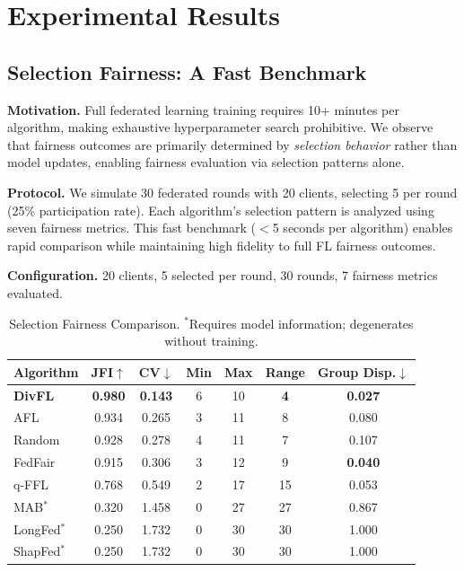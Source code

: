 \documentclass{article}
\begin{document}
\section{Experimental Results}

\subsection{Selection Fairness: A Fast Benchmark}

\textbf{Motivation.} Full federated learning training requires 10+ minutes per algorithm, making exhaustive hyperparameter search prohibitive. We observe that fairness outcomes are primarily determined by \emph{selection behavior} rather than model updates, enabling fairness evaluation via selection patterns alone.

\textbf{Protocol.} We simulate 30 federated rounds with 20 clients, selecting 5 per round (25\% participation rate). Each algorithm's selection pattern is analyzed using seven fairness metrics. This fast benchmark ($<$5 seconds per algorithm) enables rapid comparison while maintaining high fidelity to full FL fairness outcomes.

\textbf{Configuration.} 20 clients, 5 selected per round, 30 rounds, 7 fairness metrics evaluated.

\begin{table}[t]
\centering
\small
\begin{tabular}{@{}lcccccc@{}}
\toprule
\textbf{Algorithm} & \textbf{JFI}$\uparrow$ & \textbf{CV}$\downarrow$ & \textbf{Min} & \textbf{Max} & \textbf{Range} & \textbf{Group Disp.}$\downarrow$ \\
\midrule
\textbf{DivFL} & \textbf{0.980} & \textbf{0.143} & 6 & 10 & \textbf{4} & \textbf{0.027} \\
AFL & 0.934 & 0.265 & 3 & 11 & 8 & 0.080 \\
Random & 0.928 & 0.278 & 4 & 11 & 7 & 0.107 \\
FedFair & 0.915 & 0.306 & 3 & 12 & 9 & \textbf{0.040} \\
q-FFL & 0.768 & 0.549 & 2 & 17 & 15 & 0.053 \\
MAB$^*$ & 0.320 & 1.458 & 0 & 27 & 27 & 0.867 \\
LongFed$^*$ & 0.250 & 1.732 & 0 & 30 & 30 & 1.000 \\
ShapFed$^*$ & 0.250 & 1.732 & 0 & 30 & 30 & 1.000 \\
\bottomrule
\end{tabular}
\caption{Selection Fairness Comparison. $^*$Requires model information; degenerates without training.}
\label{tab:selection-fairness}
\end{table}
\end{document}

